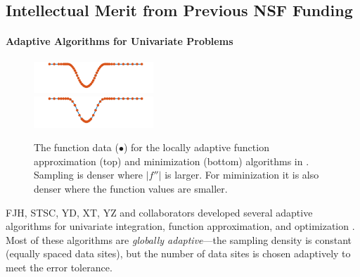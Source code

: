 \documentclass[11pt]{NSFamsart}
\def\abs#1{\ensuremath{\left \lvert #1 \right \rvert}}
\begin{document}
\subsection{Intellectual Merit from Previous NSF Funding}
\label{previousmeritsubsec}

\paragraph*{Adaptive Algorithms for Univariate Problems} \label{sec:localadpat}
\begin{figure}
	\centering
	\vspace{-1ex}
	\includegraphics[width = 0.4\textwidth]{ProgramsImages/sampling-funappxg.png}
	\\
	\includegraphics[width = 0.4\textwidth]{ProgramsImages/sampling-funming.png}

	\vspace{-2ex}
	\caption{The function data ({\color{MATLABOrange}$\bullet$}) for the locally adaptive 
	function approximation (top) and minimization (bottom) algorithms in \cite{ChoEtal17a}.  Sampling is denser where $\abs{f''}$ is larger.  For miminization it is also denser where the function values are smaller. \label{localadaptfig}}
\end{figure}

FJH, STSC, YD, XT, YZ and collaborators developed several adaptive algorithms for univariate integration, function approximation, and optimization \cite{ChoEtal17a,HicEtal14b,  Din15a, Ton14a, Zha18a}.  Most of these algorithms are \emph{globally adaptive}---the sampling density is constant (equally spaced data sites), but the number of data sites is chosen adaptively to meet the error tolerance.
\end{document}
